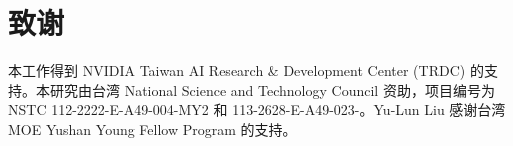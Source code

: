 \documentclass[runningheads]{llncs}
\begin{document}
\section*{致谢}
本工作得到 NVIDIA Taiwan AI Research \& Development Center (TRDC) 的支持。本研究由台湾 National Science and Technology Council 资助，项目编号为 NSTC 112-2222-E-A49-004-MY2 和 113-2628-E-A49-023-。Yu-Lun Liu 感谢台湾 MOE Yushan Young Fellow Program 的支持。

%
%





\clearpage
\appendix

\end{document}
